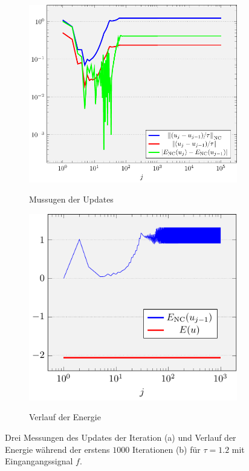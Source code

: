 \begin{figure}[p]
  \centering
  \begin{subfigure}[b]{.48\linewidth}
    \centering
    \caption{Mussugen der Updates}
    \includegraphics[width=\linewidth]
      {pictures/chapExperiments/secParameters/parTau/f01NoConv/1Dot2/convIter.pdf}
    \label{fig:parTauNoConvergenceUpdates}
  \end{subfigure}
  \quad
  \begin{subfigure}[b]{.47\linewidth}
    \centering
    \caption{Verlauf der Energie}
    \includegraphics[width=\linewidth]
      {pictures/chapExperiments/secParameters/parTau/f01NoConv/1Dot2/convEnergy.pdf}
    \label{fig:parTauNoConvergenceEnergy}
  \end{subfigure}
  \caption{Drei Messungen des Updates der Iteration (a) und Verlauf der
  Energie während der erstens $1000$ Iterationen (b) für $\tau=1.2$ mit
  Eingangangssignal $f$.}
  \label{fig:parTauNoConvergence}
\end{figure}
